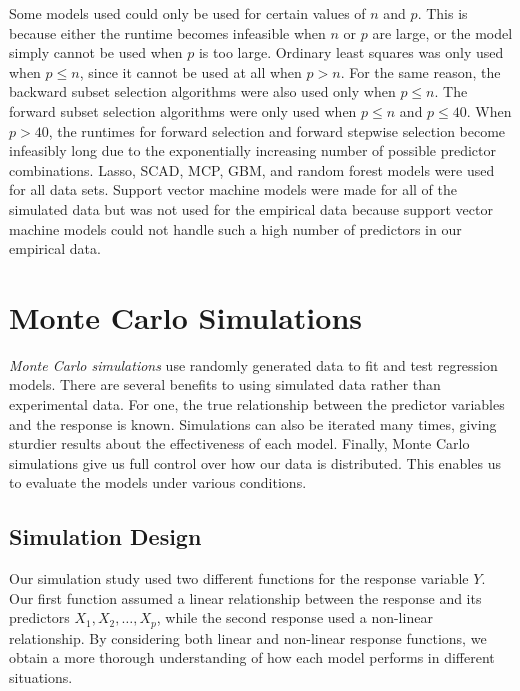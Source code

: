 \documentclass{article}
\begin{document}
	Some models used could only be used for certain values of $n$ and $p$. This is because either the runtime becomes infeasible when $n$ or $p$ are large, or the model simply cannot be used when $p$ is too large. Ordinary least squares was only used when $p\leq n$, since it cannot be used at all when $p>n$. For the same reason, the backward subset selection algorithms were also used only when $p\leq n$. The forward subset selection algorithms were only used when $p\leq n$ and $p\leq 40$. When $p>40$, the runtimes for forward selection and forward stepwise selection become infeasibly long due to the exponentially increasing number of possible predictor combinations. Lasso, SCAD, MCP, GBM, and random forest models were used for all data sets. Support vector machine models were made for all of the simulated data but was not used for the empirical data because support vector machine models could not handle such a high number of predictors in our empirical data.
	
	\section{Monte Carlo Simulations}\label{sec:simulations}
	
	\textit{Monte Carlo simulations} use randomly generated data to fit and test regression  models. There are several benefits to using simulated data rather than experimental data. For one, the true relationship between the predictor variables and the response is known. Simulations can also be iterated many times, giving sturdier results about the effectiveness of each model. Finally, Monte Carlo simulations give us full control over how our data is distributed. This enables us to evaluate the models under various conditions.
	
	
	\subsection{Simulation Design}
	
	Our simulation study used two different functions for the response variable $Y$. Our first function assumed a linear relationship between the response and its predictors $X_1, X_2, \dotsc, X_p$, while the second response used a non-linear relationship. By considering both linear and non-linear response functions, we obtain a more thorough understanding of how each model performs in different situations.
	
\end{document}
